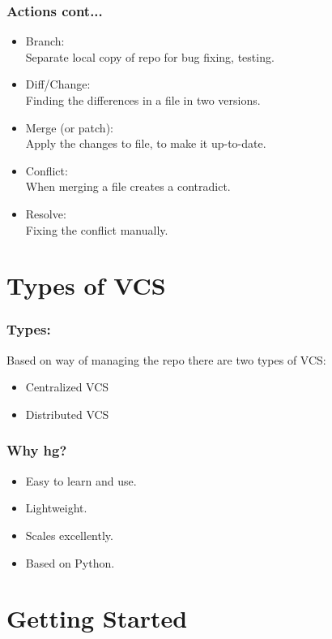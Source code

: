 \documentclass[14pt,compress]{beamer}
\begin{document}
\begin{frame}
  \frametitle{Actions cont...}
  \begin{itemize}
  \item Branch:\\
    Separate local copy of repo for bug fixing, testing.
  \item Diff/Change:\\
    Finding the differences in a file in two versions.
  \item Merge (or patch):\\
    Apply the changes to file, to make it up-to-date.
  \item Conflict:\\
    When merging a file creates a contradict.
  \item Resolve:\\
    Fixing the conflict manually.
  \end{itemize}
\end{frame}

\section{Types of VCS}

\begin{frame}
  \frametitle{Types:}
  Based on way of managing the repo there are two types of VCS:
  \begin{itemize}
  \item Centralized VCS
  \item Distributed VCS
  \end{itemize}
\end{frame}

\begin{frame}
  \frametitle{Why hg?}
  \begin{itemize}
  \item Easy to learn and use.
  \item Lightweight.
  \item Scales excellently.
  \item Based on Python.
  \end{itemize}
\end{frame}

\section{Getting Started}
\end{document}
